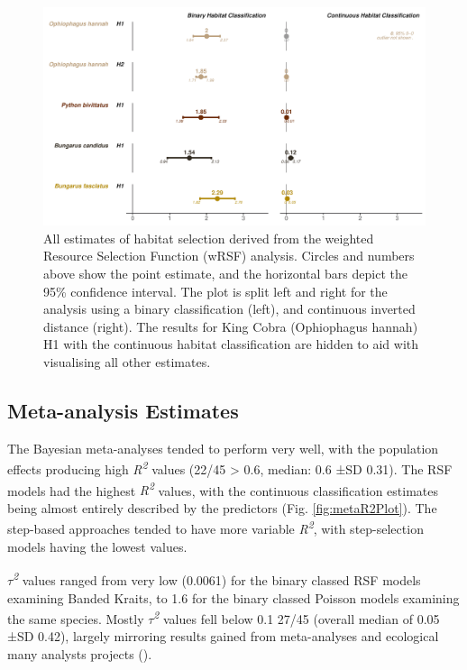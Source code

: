 \documentclass[10pt,a4paper]{article}
\begin{document}
\begin{figure}
\includegraphics[width=1\linewidth]{../../figures/specCurve_wrsf} \caption{All estimates of habitat selection derived from the weighted Resource Selection Function (wRSF) analysis. Circles and numbers above show the point estimate, and the horizontal bars depict the 95\% confidence interval. The plot is split left and right for the analysis using a binary classification (left), and continuous inverted distance (right). The results for King Cobra (Ophiophagus hannah) H1 with the continuous habitat classification are hidden to aid with visualising all other estimates.}\label{fig:specCurveWrsf}
\end{figure}

\subsection{Meta-analysis Estimates}\label{meta-analysis-estimates}

The Bayesian meta-analyses tended to perform very well, with the population effects producing high \emph{R\textsuperscript{2}} values (22/45 \textgreater{} 0.6, median: 0.6 ±SD 0.31).
The RSF models had the highest \emph{R\textsuperscript{2}} values, with the continuous classification estimates being almost entirely described by the predictors (Fig. \ref{fig:metaR2Plot}).
The step-based approaches tended to have more variable \emph{R\textsuperscript{2}}, with step-selection models having the lowest values.

\emph{\(\tau\)\textsuperscript{2}} values ranged from very low (0.0061) for the binary classed RSF models examining Banded Kraits, to 1.6 for the binary classed Poisson models examining the same species.
Mostly \emph{\(\tau\)\textsuperscript{2}} values fell below 0.1 27/45 (overall median of 0.05 ±SD 0.42), largely mirroring results gained from meta-analyses and ecological many analysts projects ().
\end{document}
